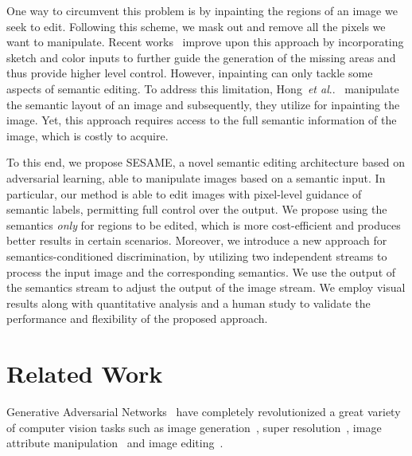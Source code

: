 \documentclass[runningheads]{llncs}
\makeatletter
\DeclareRobustCommand\onedot{\futurelet\@let@token\@onedot}
\def\@onedot{\ifx\@let@token.\else.\null\fi\xspace}
\def\etal{\emph{et al}\onedot}
\def\hong{Hong~\etal~\cite{hong2018learning}}
\makeatother
\begin{document}
One way to circumvent this problem is by inpainting the regions of an image we seek to edit.
Following this scheme, we mask out and remove all the pixels we want to manipulate.
Recent works~\cite{yu2018free,nazeri2019edgeconnect,faceshop,Jo_2019_ICCV} improve upon this approach by incorporating sketch and color inputs to further guide the generation of the missing areas and thus provide higher level control.
However, inpainting can only tackle some aspects of semantic editing.
To address this limitation, \hong{} manipulate the semantic layout of an image and subsequently, they utilize for inpainting the image.
Yet, this approach requires access to the full semantic information of the image, which is costly to acquire.

To this end, we propose SESAME, a novel semantic editing architecture based on adversarial learning, able to manipulate images based on a semantic input.
In particular, our method is able to edit images with pixel-level guidance of semantic labels, permitting full control over the output. We propose using the semantics \emph{only} for regions to be edited, which is more cost-efficient and produces better results in certain scenarios.
Moreover, we introduce a new approach for semantics-conditioned discrimination, by utilizing two independent streams to process the input image and the corresponding semantics. 
We use the output of the semantics stream to adjust the output of the image stream.
We employ visual results along with quantitative analysis and a human study to validate the performance and flexibility of the proposed approach.

\section{Related Work}
\label{sec:related_work}

Generative Adversarial Networks~\cite{goodfellowGAN} have completely revolutionized a great variety of computer vision tasks such as image generation~\cite{Karras_2019_CVPR,karras2018progressive,miyato2018spectral}, super resolution~\cite{wang2018esrgan,lugmayr2019aim}, image attribute manipulation~\cite{mao2019mode,romero2019smit} and image editing~\cite{hong2018learning,Bau_Ganpaint_2019}.
\end{document}
